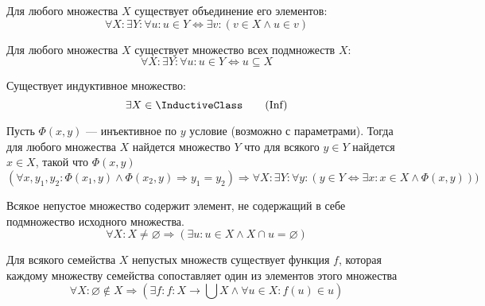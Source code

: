 \documentclass{article}
\begin{document}
    \begin{axiom}
        Для любого множества \(X\) существует объединение его элементов:
        \begin{equation}
            \label{ZFC-Union}
            \forall X: \exists Y: \forall u: u \in Y \Leftrightarrow \exists v: (v \in X \land u \in v) \tag{Union}
        \end{equation}
    \end{axiom}
    \begin{axiom}
        Для любого множества \(X\) существует множество  всех подмножеств \(X\):
        \begin{equation}
            \label{ZFC-Power}
            \forall X: \exists Y: \forall u: u \in Y \Leftrightarrow u \subseteq X \tag{Power}
        \end{equation}
    \end{axiom}
    \begin{axiom}
        Существует индуктивное множество:
        \begin{equation}
            \label{ZFC-Inf}
            \exists X \in \InductiveClass \tag{Inf}
        \end{equation}
    \end{axiom}
    \begin{axiom}
        Пусть \(\Phi(x,y)\) — инъективное по \(y\) условие (возможно с параметрами). Тогда для любого множества \(X\) найдется множество \(Y\) что для всякого \(y \in Y\) найдется \(x \in X\), такой что \(\Phi(x, y)\)
        \begin{equation}
            \label{ZFC-Repl}
            \left(\forall x, y_1, y_2: \Phi(x_1, y) \land \Phi(x_2, y) \Rightarrow y_1 = y_2 \right) \Rightarrow  \forall X:\exists Y: \forall y: (y \in Y \Leftrightarrow \exists x: x \in X \land \Phi(x, y))) \tag{Repl}
        \end{equation}
    \end{axiom}
    \begin{axiom}
        Всякое непустое множество содержит элемент, не содержащий в себе подмножество исходного множества.
        \begin{equation}
            \label{ZFC-Reg}
            \forall X: X \ne \varnothing \Rightarrow (\exists u: u \in X \land X \cap u = \varnothing) \tag{Reg}
        \end{equation}
    \end{axiom}
    \begin{axiom}
        Для всякого семейства \(X\) непустых множеств существует функция \(f\), которая каждому множеству семейства сопоставляет один из элементов этого множества
        \begin{equation}
            \label{ZFC-Choice}
            \forall X: \varnothing \not\in X \Rightarrow \left(\exists f: f: X \to \bigcup X \land \forall u \in X: f(u) \in u\right) \tag{Choice}
        \end{equation}
    \end{axiom}
\end{document}
